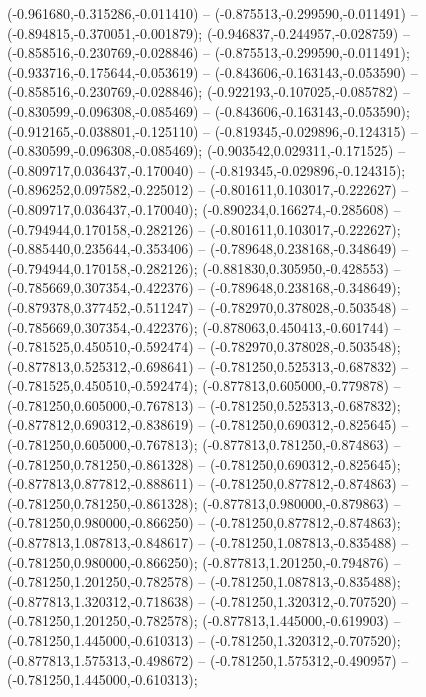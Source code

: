  (-0.961680,-0.315286,-0.011410) -- (-0.875513,-0.299590,-0.011491) -- (-0.894815,-0.370051,-0.001879);
 (-0.946837,-0.244957,-0.028759) -- (-0.858516,-0.230769,-0.028846) -- (-0.875513,-0.299590,-0.011491);
 (-0.933716,-0.175644,-0.053619) -- (-0.843606,-0.163143,-0.053590) -- (-0.858516,-0.230769,-0.028846);
 (-0.922193,-0.107025,-0.085782) -- (-0.830599,-0.096308,-0.085469) -- (-0.843606,-0.163143,-0.053590);
 (-0.912165,-0.038801,-0.125110) -- (-0.819345,-0.029896,-0.124315) -- (-0.830599,-0.096308,-0.085469);
 (-0.903542,0.029311,-0.171525) -- (-0.809717,0.036437,-0.170040) -- (-0.819345,-0.029896,-0.124315);
 (-0.896252,0.097582,-0.225012) -- (-0.801611,0.103017,-0.222627) -- (-0.809717,0.036437,-0.170040);
 (-0.890234,0.166274,-0.285608) -- (-0.794944,0.170158,-0.282126) -- (-0.801611,0.103017,-0.222627);
 (-0.885440,0.235644,-0.353406) -- (-0.789648,0.238168,-0.348649) -- (-0.794944,0.170158,-0.282126);
 (-0.881830,0.305950,-0.428553) -- (-0.785669,0.307354,-0.422376) -- (-0.789648,0.238168,-0.348649);
 (-0.879378,0.377452,-0.511247) -- (-0.782970,0.378028,-0.503548) -- (-0.785669,0.307354,-0.422376);
 (-0.878063,0.450413,-0.601744) -- (-0.781525,0.450510,-0.592474) -- (-0.782970,0.378028,-0.503548);
 (-0.877813,0.525312,-0.698641) -- (-0.781250,0.525313,-0.687832) -- (-0.781525,0.450510,-0.592474);
 (-0.877813,0.605000,-0.779878) -- (-0.781250,0.605000,-0.767813) -- (-0.781250,0.525313,-0.687832);
 (-0.877812,0.690312,-0.838619) -- (-0.781250,0.690312,-0.825645) -- (-0.781250,0.605000,-0.767813);
 (-0.877813,0.781250,-0.874863) -- (-0.781250,0.781250,-0.861328) -- (-0.781250,0.690312,-0.825645);
 (-0.877813,0.877812,-0.888611) -- (-0.781250,0.877812,-0.874863) -- (-0.781250,0.781250,-0.861328);
 (-0.877813,0.980000,-0.879863) -- (-0.781250,0.980000,-0.866250) -- (-0.781250,0.877812,-0.874863);
 (-0.877813,1.087813,-0.848617) -- (-0.781250,1.087813,-0.835488) -- (-0.781250,0.980000,-0.866250);
 (-0.877813,1.201250,-0.794876) -- (-0.781250,1.201250,-0.782578) -- (-0.781250,1.087813,-0.835488);
 (-0.877813,1.320312,-0.718638) -- (-0.781250,1.320312,-0.707520) -- (-0.781250,1.201250,-0.782578);
 (-0.877813,1.445000,-0.619903) -- (-0.781250,1.445000,-0.610313) -- (-0.781250,1.320312,-0.707520);
 (-0.877813,1.575313,-0.498672) -- (-0.781250,1.575312,-0.490957) -- (-0.781250,1.445000,-0.610313);

